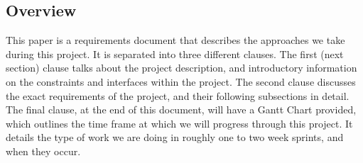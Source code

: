 \documentclass[letterpaper,10pt,draftclsnofoot,onecolumn,compsoc]{IEEEtran}
\begin{document}
\subsection{Overview}
\begin{singlespace}
\noindent
This paper is a requirements document that describes the approaches we take during this project. It is separated into three different clauses. The first (next section) clause talks about the project description, and introductory information on the constraints and interfaces within the project. The second clause discusses the exact requirements of the project, and their following subsections in detail. The final clause, at the end of this document, will have a Gantt Chart provided, which outlines the time frame at which we will progress through this project. It details the type of work we are doing in roughly one to two week sprints, and when they occur.
\end{singlespace}
\end{document}
